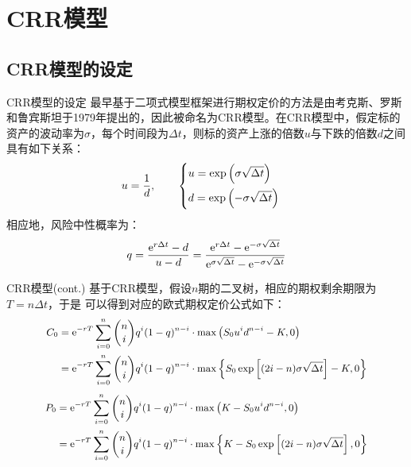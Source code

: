 \documentclass[t]{beamer}
\begin{document}
\section{CRR模型}
\subsection{CRR模型的设定}
\begin{frame}{CRR模型的设定}
	最早基于二项式模型框架进行期权定价的方法是由考克斯、罗斯和鲁宾斯坦于1979年提出的，因此被命名为CRR模型。在CRR模型中，假定标的资产的波动率为$\sigma$，每个时间段为$\Delta t$，则标的资产上涨的倍数$u$与下跌的倍数$d$之间具有如下关系：
\begin{equation*}
u=\frac{1}{d},\qquad \begin{cases}
\vspace{1ex} u=\exp\left(\sigma\sqrt{\Delta t}\right)\\
d=\exp\left(-\sigma\sqrt{\Delta t}\right) \\
\end{cases}
\end{equation*}
相应地，风险中性概率为：
\begin{equation*}
q=\frac{{\rm e}^{r\Delta t}-d}{u-d}=\frac{{\rm e}^{r\Delta t}-{\rm e}^{-\sigma\sqrt{\Delta t}}}{{\rm e}^{\sigma\sqrt{\Delta t}}-{\rm e}^{-\sigma\sqrt{\Delta t}}}
\end{equation*}
\end{frame}

\begin{frame}{CRR模型(cont.)}
	基于CRR模型，假设$n$期的二叉树，相应的期权剩余期限为$T=n\Delta t$，于是
可以得到对应的欧式期权定价公式如下：
\begin{equation*}\small
\begin{split}
C_0&={\rm e}^{-rT}\sum^n_{i=0}{n\choose i}q^i(1-q)^{n-i}\cdot \max\left(S_0 u^id^{n-i}-K,0\right)\\
&={\rm e}^{-rT}\sum^n_{i=0}{n\choose i}q^i(1-q)^{n-i}\cdot \max\left\{S_0 \exp\left[(2i-n)\sigma\sqrt{\Delta t} \right] -K,0\right\}\\
\end{split}
\end{equation*}
\begin{equation*}\small
\begin{split}
P_0&={\rm e}^{-rT}\sum^n_{i=0}{n\choose i}q^i(1-q)^{n-i}\cdot \max\left(K-S_0 u^id^{n-i},0\right)\\
&={\rm e}^{-rT}\sum^n_{i=0}{n\choose i}q^i(1-q)^{n-i}\cdot \max\left\{K-S_0\exp \left[(2i-n)\sigma\sqrt{\Delta t} \right],0\right\}
\end{split}
\end{equation*}
\end{frame}
\end{document}
